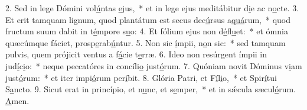2. Sed in lege Dómini vol\uline{ú}ntas \uline{e}jus,~* et in lege ejus meditábitur d\uline{i}e ac n\uline{o}cte.
3. Et erit tamquam lignum, quod plantátum est secus dec\uline{ú}rsus a\uline{quá}rum,~* quod fructum suum dabit in t\uline{é}mpore s\uline{u}o:
4. Et fólium ejus non d\uline{é}fl\uline{u}et:~* et ómnia quæcúmque fáciet, prosp\uline{e}rab\uline{ú}ntur.
5. Non sic \uline{í}mpii, n\uline{o}n sic:~* sed tamquam pulvis, quem prójicit ventus a f\uline{á}cie t\uline{e}rræ.
6. Ideo non resúrgent ímpii in jud\uline{í}c\uline{i}o:~* neque peccatóres in concíli\uline{o} just\uline{ó}rum.
7. Quóniam novit Dóminus v\uline{i}am just\uline{ó}rum:~* et iter impi\uline{ó}rum per\uline{í}bit.
8. Glória Patri, et F\uline{í}l\uline{i}o,~* et Spir\uline{í}tui S\uline{a}ncto.
9. Sicut erat in princípio, et n\uline{u}nc, et s\uline{e}mper,~* et in sǽcula sæcul\uline{ó}rum. \uline{A}men.
